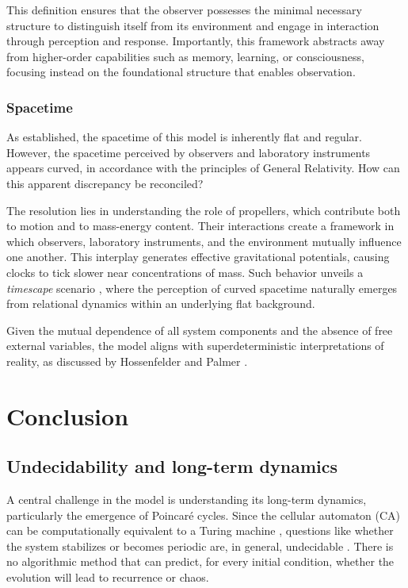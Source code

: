 \documentclass[12pt]{article}
\begin{document}
This definition ensures that the observer possesses the minimal necessary structure to distinguish itself from its environment and engage in interaction through perception and response. Importantly, this framework abstracts away from higher-order capabilities such as memory, learning, or consciousness, focusing instead on the foundational structure that enables observation.

\subsubsection{Spacetime}
As established, the spacetime of this model is inherently flat and regular. However, the spacetime perceived by observers and laboratory instruments appears curved, in accordance with the principles of General Relativity. How can this apparent discrepancy be reconciled?  

The resolution lies in understanding the role of propellers, which contribute both to motion and to mass-energy content. Their interactions create a framework in which observers, laboratory instruments, and the environment mutually influence one another. This interplay generates effective gravitational potentials, causing clocks to tick slower near concentrations of mass. Such behavior unveils a \textit{timescape} scenario \cite{duley2013timescape}, where the perception of curved spacetime naturally emerges from relational dynamics within an underlying flat background.

Given the mutual dependence of all system components and the absence of free external variables, the model aligns with superdeterministic interpretations of reality, as discussed by Hossenfelder and Palmer \cite{hossenfelder2020rethinking}.


\section{Conclusion\label{sec:Discussion}}

\subsection{Undecidability and long-term dynamics}\label{sec-undecidability}

A central challenge in the model is understanding its long-term dynamics, particularly the emergence of Poincaré cycles. Since the cellular automaton (CA) can be computationally equivalent to a Turing machine \cite{wolfram1983}, questions like whether the system stabilizes or becomes periodic are, in general, undecidable \cite{gacs1979}. There is no algorithmic method that can predict, for every initial condition, whether the evolution will lead to recurrence or chaos.
\end{document}

